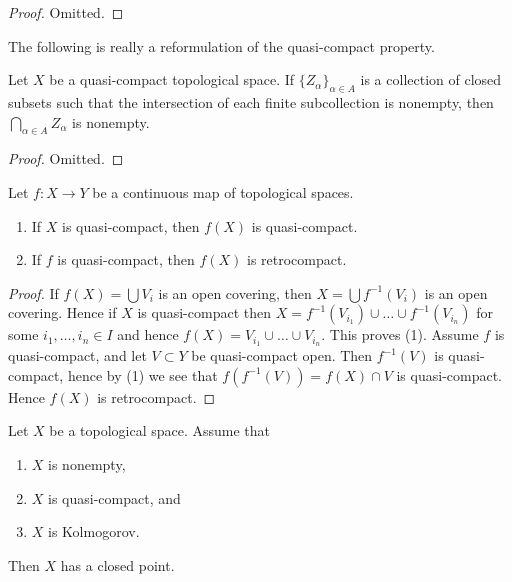 \begin{proof}
Omitted.
\end{proof}

\noindent
The following is really a reformulation of the
quasi-compact property.

\begin{lemma}
\label{lemma-intersection-closed-in-quasi-compact}
Let $X$ be a quasi-compact topological space.
If $\{Z_\alpha\}_{\alpha \in A}$ is a collection of closed subsets
such that the intersection of each finite subcollection
is nonempty, then $\bigcap_{\alpha \in A} Z_\alpha$ is nonempty.
\end{lemma}

\begin{proof}
Omitted.
\end{proof}

\begin{lemma}
\label{lemma-image-quasi-compact}
Let $f : X \to Y$ be a continuous map of topological spaces.
\begin{enumerate}
\item If $X$ is quasi-compact, then $f(X)$ is quasi-compact.
\item If $f$ is quasi-compact, then $f(X)$ is retrocompact.
\end{enumerate}
\end{lemma}

\begin{proof}
If $f(X) = \bigcup V_i$ is an open covering, then $X = \bigcup f^{-1}(V_i)$
is an open covering. Hence if $X$ is quasi-compact then
$X = f^{-1}(V_{i_1}) \cup \ldots \cup f^{-1}(V_{i_n})$ for some
$i_1, \ldots, i_n \in I$ and hence
$f(X) = V_{i_1} \cup \ldots \cup V_{i_n}$. This proves (1).
Assume $f$ is quasi-compact, and let $V \subset Y$ be quasi-compact open.
Then $f^{-1}(V)$ is quasi-compact, hence by (1) we see that
$f(f^{-1}(V)) = f(X) \cap V$ is quasi-compact. Hence $f(X)$
is retrocompact.
\end{proof}

\begin{lemma}
\label{lemma-quasi-compact-closed-point}
Let $X$ be a topological space. Assume that
\begin{enumerate}
\item $X$ is nonempty,
\item $X$ is quasi-compact, and
\item $X$ is Kolmogorov.
\end{enumerate}
Then $X$ has a closed point.
\end{lemma}


